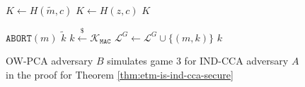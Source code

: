 \documentclass[runningheads]{llncs}
\newcommand{\mac}{\texttt{MAC}}
\newcommand{\pco}{\texttt{PCO}}
\newcommand{\leftsample}{\stackrel{\$}{\leftarrow}}
\begin{document}
\begin{figure}[h]
\begin{minipage}[t]{0.49\textwidth}
\begin{algorithm}[H]
\begin{algorithmic}[1]
                    \State $K \leftarrow H(\tilde{m}, c)$
                \Else
                    \State $K \leftarrow H(z, c)$
                \EndIf
                \State \Return $K$
            \end{algorithmic}
        \end{algorithm}\vspace{-4em}
        \begin{algorithm}[H]
            \caption*{$\mathcal{O}^G_B(m)$}
            \begin{algorithmic}[1]
                \If{$\mathcal{O}^\pco(m, {c^\prime}^\ast) = 1$}
                    \State $\texttt{ABORT}(m)$
                \EndIf
                    \State \Return $\tilde{k}$
                \EndIf
                \State $k \leftsample \mathcal{K}_\mac$
                \State $\mathcal{L}^G \leftarrow \mathcal{L}^G \cup \{(m, k)\}$
                \State \Return $k$
            \end{algorithmic}
        \end{algorithm}
    \end{minipage}
    \caption{OW-PCA adversary $B$ simulates game 3 for IND-CCA adversary $A$ in the proof for Theorem \ref{thm:etm-is-ind-cca-secure}}\label{fig:ow-pca-simulates-game-3}
\end{figure}
\end{document}
